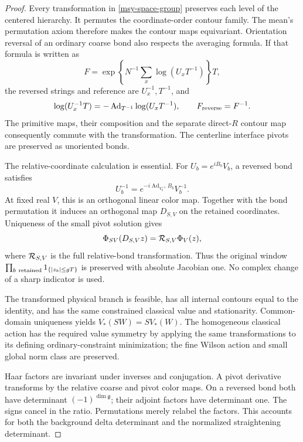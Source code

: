 \begin{proof}
Every transformation in \eqref{msy-space-group} preserves each level
of the centered hierarchy. It permutes the coordinate-order contour
family. The mean's permutation axiom therefore makes the contour
maps equivariant. Orientation reversal of an ordinary coarse bond
also respects the averaging formula. If that formula is written as
\[
 F=\exp\!\left\{N^{-1}\sum_x\log(U_xT^{-1})\right\}T,
\]
the reversed strings and reference are \(U_x^{-1},T^{-1}\), and
\begin{equation}
 \log(U_x^{-1}T)
     =-\operatorname{Ad}_{T^{-1}}\log(U_xT^{-1}),
 \qquad F_{\rm reverse}=F^{-1}.
 \label{msy-average-reversal}
\end{equation}
The primitive maps, their composition and the separate direct-\(R\)
contour map consequently commute with the transformation. The
centerline interface pivots are preserved as unoriented bonds.

The relative-coordinate calculation is essential. For
\(U_b=e^{iB_b}V_b\), a reversed bond satisfies
\begin{equation}
 U_b^{-1}
   =e^{-i\operatorname{Ad}_{V_b^{-1}}B_b}V_b^{-1}.
 \label{msy-relative-reversal}
\end{equation}
At fixed real \(V\), this is an orthogonal linear color map.
Together with the bond permutation it induces an orthogonal map
\(D_{S,V}\) on the retained coordinates. Uniqueness of the small
pivot solution gives
\begin{equation}
 \Phi_{SV}(D_{S,V}z)
       ={\cal R}_{S,V}\Phi_V(z),
 \label{msy-chart}
\end{equation}
where \({\cal R}_{S,V}\) is the full relative-bond transformation.
Thus the original window
\(\prod_{b\ {\rm retained}}1_{\{|z_b|\le gT\}}\)
is preserved with absolute Jacobian one. No complex change of a
sharp indicator is used.

The transformed physical branch is feasible, has all internal
contours equal to the identity, and has the same constrained
classical value and stationarity. Common-domain uniqueness yields
\(V_*(SW)=SV_*(W)\). The homogeneous classical action has the
required value symmetry by applying the same transformations
to its defining ordinary-constraint minimization; the fine Wilson
action and small global norm class are preserved.

Haar factors are invariant under inverses and conjugation. A pivot
derivative transforms by the relative coarse and pivot color maps.
On a reversed bond both have determinant
\((-1)^{\dim\mathfrak g}\); their adjoint factors have determinant
one. The signs cancel in the ratio. Permutations merely relabel
the factors. This accounts for both the background delta
determinant and the normalized straightening determinant.


\end{proof}
